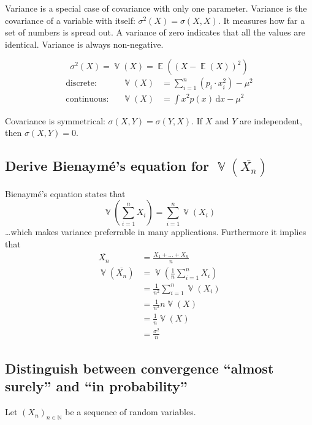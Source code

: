 \documentclass[a4paper]{article}
\newcommand\dt{\,\text{d}}
\DeclareMathOperator{\Ex}{\mathbb{E}}
\DeclareMathOperator{\Va}{\mathbb{V}}
\theoremstyle{definition}
\begin{document}
Variance is a special case of covariance with only one parameter. Variance is the covariance of a variable with itself: $\sigma^2(X) = \sigma(X, X)$. It measures how far a set of numbers is spread out. A variance of zero indicates that all the values are identical. Variance is always non-negative.

\[ \sigma^2(X) = \Va(X) = \Ex((X - \Ex(X))^2) \]
\begin{align*}
  \text{discrete:}   && \Va(X) &= \sum_{i=1}^n (p_i \cdot x_i^2) - \mu^2 \\
  \text{continuous:} && \Va(X) &= \int x^2 p(x) \dt x - \mu^2
\end{align*}

Covariance is symmetrical: $\sigma(X, Y) = \sigma(Y, X)$. If $X$ and $Y$ are independent, then $\sigma(X, Y) = 0$.

\subsection{Derive Bienaymé's equation for $\Va(\overline{X_n})$}

Bienaymé's equation states that
%
\[
  \Va\left(\sum_{i=1}^n X_i\right) = \sum_{i=1}^n \Va(X_i)
\]
%
\dots which makes variance preferrable in many applications. Furthermore it implies that 
%
\begin{align*}
  \overline{X_n}                 &= \frac{X_1 + \ldots + X_n}{n} \\
  \Va\left(\overline{X_n}\right) &= \Va\left(\frac1n \sum_{i=1}^n X_i\right) \\
                                 &= \frac1{n^2} \sum_{i=1}^n \Va(X_i) \\
                                 &= \frac1{n^2} n \Va(X) \\
                                 &= \frac1n \Va(X) \\
                                 &= \frac{\sigma^2}{n}
\end{align*}

\subsection{Distinguish between convergence \enquote{almost surely} and \enquote{in probability}}

Let $\left(X_n\right)_{n \in \mathbb{N}}$ be a sequence of random variables.
\end{document}
